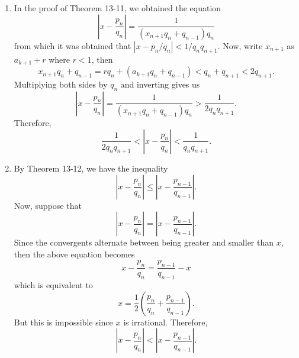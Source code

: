 \begin{solution}
    \begin{enumerate}
        \item In the proof of Theorem 13-11, we obtained the equation
        $$\left|x - \frac{p_n}{q_n}\right| = \frac{1}{(x_{n+1}q_n + q_{n-1})q_n}$$
        from which it was obtained that $|x - p_n/q_n| < 1/q_nq_{n+1}$. Now, write $x_{n+1}$ as $a_{k+1} + r$ where $r < 1$, then
        $$x_{n+1}q_n + q_{n-1} = rq_n + (a_{k+1}q_n + q_{n-1}) < q_n + q_{n+1} < 2q_{n+1}.$$
        Multiplying both sides by $q_n$ and inverting gives us
        $$\left|x - \frac{p_n}{q_n}\right| = \frac{1}{(x_{n+1}q_n + q_{n-1})q_n} > \frac{1}{2q_nq_{n+1}}.$$
        Therefore,
        $$\frac{1}{2q_nq_{n+1}} < \left|x - \frac{p_n}{q_n}\right| < \frac{1}{q_nq_{n+1}}.$$
        \item By Theorem 13-12, we have the inequality
        $$\left|x - \frac{p_n}{q_n}\right| \leq \left|x - \frac{p_{n-1}}{q_{n-1}}\right|.$$
        Now, suppose that
        $$\left|x - \frac{p_n}{q_n}\right| = \left|x - \frac{p_{n-1}}{q_{n-1}}\right|.$$
        Since the convergents alternate between being greater and smaller than $x$, then the above equation becomes 
        $$x - \frac{p_n}{q_n} = \frac{p_{n-1}}{q_{n-1}} - x$$
        which is equivalent to
        $$x = \frac{1}{2}\left(\frac{p_n}{q_n} + \frac{p_{n-1}}{q_{n-1}}\right).$$
        But this is impossible since $x$ is irrational. Therefore, 
        $$\left|x - \frac{p_n}{q_n}\right| < \left|x - \frac{p_{n-1}}{q_{n-1}}\right|.$$
    \end{enumerate}
\end{solution}
